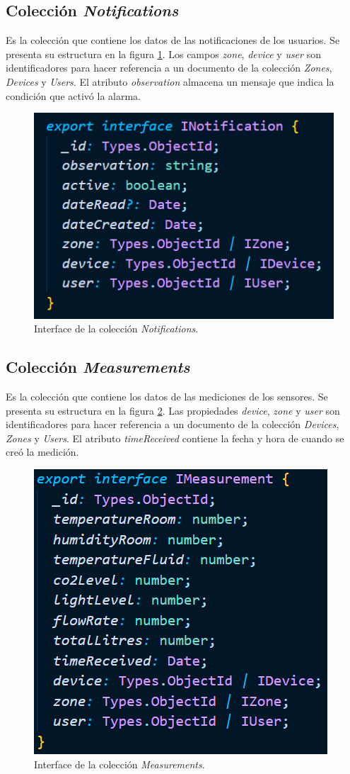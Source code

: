 \subsection{Colección \textit{Notifications}}

Es la colección que contiene los datos de las notificaciones de los usuarios. Se presenta su estructura en la figura \ref{fig:coleccionNotifications}. Los campos \textit{zone}, \textit{device} y \textit{user} son identificadores para hacer referencia a un documento de la colección \textit{Zones}, \textit{Devices} y \textit{Users}. El atributo \textit{observation} almacena un mensaje que indica la condición que activó la alarma.

\begin{figure}[H]
	\centering
	\includegraphics[width=.5\textwidth]{./Figures/Coleccion Notifications.png}
	\caption{Interface de la colección \textit{Notifications}.}
	\label{fig:coleccionNotifications}
\end{figure}

\subsection{Colección \textit{Measurements}}

Es la colección que contiene los datos de las mediciones de los sensores. Se presenta su estructura en la figura \ref{fig:coleccionMeasurements}. Las propiedades \textit{device}, \textit{zone} y \textit{user} son identificadores para hacer referencia a un documento de la colección \textit{Devices}, \textit{Zones} y \textit{Users}. El atributo \textit{timeReceived} contiene la fecha y hora de cuando se creó la medición.

\begin{figure}[H]
	\centering
	\includegraphics[width=.5\textwidth]{./Figures/Coleccion Measurements.png}
	\caption{Interface de la colección \textit{Measurements}.}
	\label{fig:coleccionMeasurements}
\end{figure}

